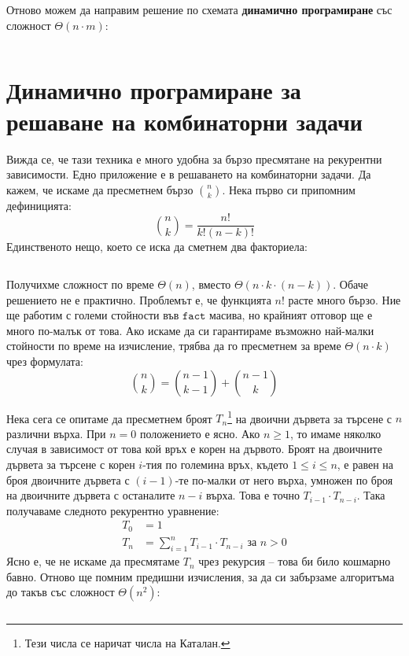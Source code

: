 \documentclass{article}
\theoremstyle{definition}
\theoremstyle{plain}
\theoremstyle{remark}
\theoremstyle{definition}
\begin{document}
\pagebreak

Отново можем да направим решение по схемата \textbf{динамично програмиране} със сложност $\Theta(n \cdot m)$:
\inputminted[linenos]{c++}{algorithms/longest_common_subsequence.cpp}

\section*{Динамично програмиране за решаване на комбинаторни задачи}

Вижда се, че тази техника е много удобна за бързо пресмятане на рекурентни зависимости.
Едно приложение е в решаването на комбинаторни задачи.
Да кажем, че искаме да пресметнем бързо ${n \choose k}$.
Нека първо си припомним дефиницията:
\[
  {n \choose k} = \frac{n!}{k! (n - k)!}
\]
Единственото нещо, което се иска да сметнем два факториела:
\inputminted[linenos]{c++}{algorithms/binomial_factorial.cpp}
Получихме сложност по време $\Theta(n)$, вместо $\Theta(n \cdot k \cdot (n - k))$.
Обаче решението не е практично.
Проблемът е, че функцията $n!$ расте много бързо.
Ние ще работим с големи стойности във $\mathtt{fact}$ масива, но крайният отговор ще е много по-малък от това.
Ако искаме да си гарантираме възможно най-малки стойности по време на изчисление, трябва да го пресметнем за време $\Theta(n \cdot k)$ чрез формулата:
\[
  {n \choose k} = {n - 1 \choose k - 1} + {n - 1 \choose k}
\]

Нека сега се опитаме да пресметнем броят $T_n$\footnote{Тези числа се наричат числа на Каталан.} на двоични дървета за търсене с $n$ различни върха.
При $n = 0$ положението е ясно.
Ако $n \geq 1$, то имаме няколко случая в зависимост от това кой връх е корен на дървото.
Броят на двоичните дървета за търсене с корен $i$-тия по големина връх, където $1 \leq i \leq n$, е равен на броя двоичните дървета с $(i - 1)$-те по-малки от него върха, умножен по броя на двоичните дървета с останалите $n - i$ върха.
Това е точно $T_{i - 1} \cdot T_{n - i}$.
Така получаваме следното рекурентно уравнение:
\begin{align*}
  T_0 & = 1                                                                 \\
  T_n & = \sum\limits_{i = 1}^n T_{i - 1} \cdot T_{n - i} \text{ за } n > 0
\end{align*}
Ясно е, че не искаме да пресмятаме $T_n$ чрез рекурсия -- това би било кошмарно бавно.
Отново ще помним предишни изчисления, за да си забързаме алгоритъма до такъв със сложност $\Theta(n^2)$:
\inputminted[linenos]{c++}{algorithms/catalan.cpp}
\end{document}
